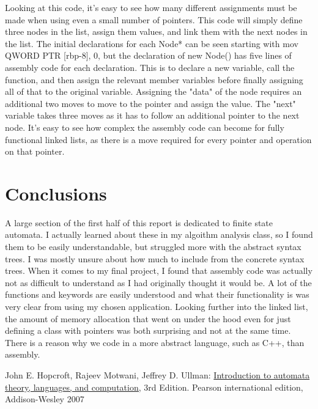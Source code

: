 \documentclass{article}
\theoremstyle{theorem}
\theoremstyle{definition}
\theoremstyle{remark}
\begin{document}
Looking at this code, it's easy to see how many different assignments must be made when using even a small number of pointers. This code will simply define three nodes in the list, assign them values, and link them with the next nodes in the list. The initial declarations for each Node* can be seen starting with mov QWORD PTR [rbp-8], 0, but the declaration of new Node() has five lines of assembly code for each declaration. This is to declare a new variable, call the function, and then assign the relevant member variables before finally assigning all of that to the original variable. Assigning the "data" of the node requires an additional two moves to move to the pointer and assign the value. The "next" variable takes three moves as it has to follow an additional pointer to the next node. It's easy to see how complex the assembly code can become for fully functional linked lists, as there is a move required for every pointer and operation on that pointer.

\section{Conclusions}\label{conclusions}

A large section of the first half of this report is dedicated to finite state automata. I actually learned about these in my algoithm analysis class, so I found them to be easily understandable, but struggled more with the abstract syntax trees. I was mostly unsure about how much to include from the concrete syntax trees. When it comes to my final project, I found that assembly code was actually not as difficult to understand as I had originally thought it would be. A lot of the functions and keywords are easily understood and what their functionality is was very clear from using my chosen application. Looking further into the linked list, the amount of memory allocation that went on under the hood even for just defining a class with pointers was both surprising and not at the same time. There is a reason why we code in a more abstract language, such as C++, than assembly.

\begin{thebibliography}{99}
	John E. Hopcroft, Rajeev Motwani, Jeffrey D. Ullman:
\href{http://ce.sharif.edu/courses/94-95/1/ce414-2/resources/root/Text\%20Books/Automata/John\%20E.\%20Hopcroft,\%20Rajeev\%20Motwani,\%20Jeffrey\%20D.\%20Ullman-Introduction\%20to\%20Automata\%20Theory,\%20Languages,\%20and\%20Computations-Prentice\%20Hall\%20(2006).pdf}{Introduction to automata theory, languages, and computation,} 3rd Edition. Pearson international edition, Addison-Wesley 2007

\end{thebibliography}
\end{document}

